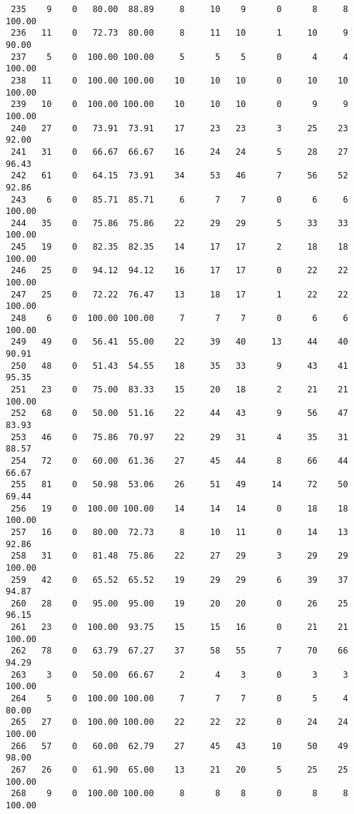\begin{verbatim}
 235    9    0   80.00  88.89     8     10    9      0      8     8   100.00
 236   11    0   72.73  80.00     8     11   10      1     10     9    90.00
 237    5    0  100.00 100.00     5      5    5      0      4     4   100.00
 238   11    0  100.00 100.00    10     10   10      0     10    10   100.00
 239   10    0  100.00 100.00    10     10   10      0      9     9   100.00
 240   27    0   73.91  73.91    17     23   23      3     25    23    92.00
 241   31    0   66.67  66.67    16     24   24      5     28    27    96.43
 242   61    0   64.15  73.91    34     53   46      7     56    52    92.86
 243    6    0   85.71  85.71     6      7    7      0      6     6   100.00
 244   35    0   75.86  75.86    22     29   29      5     33    33   100.00
 245   19    0   82.35  82.35    14     17   17      2     18    18   100.00
 246   25    0   94.12  94.12    16     17   17      0     22    22   100.00
 247   25    0   72.22  76.47    13     18   17      1     22    22   100.00
 248    6    0  100.00 100.00     7      7    7      0      6     6   100.00
 249   49    0   56.41  55.00    22     39   40     13     44    40    90.91
 250   48    0   51.43  54.55    18     35   33      9     43    41    95.35
 251   23    0   75.00  83.33    15     20   18      2     21    21   100.00
 252   68    0   50.00  51.16    22     44   43      9     56    47    83.93
 253   46    0   75.86  70.97    22     29   31      4     35    31    88.57
 254   72    0   60.00  61.36    27     45   44      8     66    44    66.67
 255   81    0   50.98  53.06    26     51   49     14     72    50    69.44
 256   19    0  100.00 100.00    14     14   14      0     18    18   100.00
 257   16    0   80.00  72.73     8     10   11      0     14    13    92.86
 258   31    0   81.48  75.86    22     27   29      3     29    29   100.00
 259   42    0   65.52  65.52    19     29   29      6     39    37    94.87
 260   28    0   95.00  95.00    19     20   20      0     26    25    96.15
 261   23    0  100.00  93.75    15     15   16      0     21    21   100.00
 262   78    0   63.79  67.27    37     58   55      7     70    66    94.29
 263    3    0   50.00  66.67     2      4    3      0      3     3   100.00
 264    5    0  100.00 100.00     7      7    7      0      5     4    80.00
 265   27    0  100.00 100.00    22     22   22      0     24    24   100.00
 266   57    0   60.00  62.79    27     45   43     10     50    49    98.00
 267   26    0   61.90  65.00    13     21   20      5     25    25   100.00
 268    9    0  100.00 100.00     8      8    8      0      8     8   100.00

\end{verbatim}
